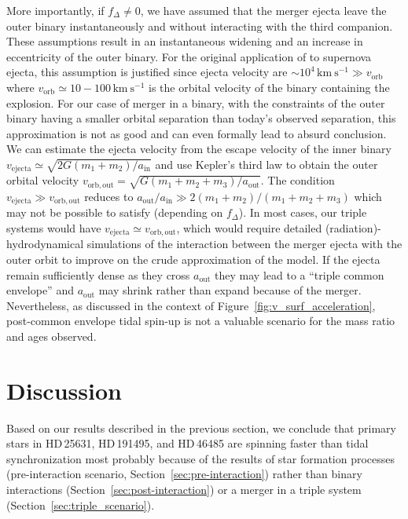 \documentclass{aa}
\DeclareRobustCommand{\Figref}[1]{Figure~\ref{#1}}
\DeclareRobustCommand{\Secref}[1]{Section~\ref{#1}}
\begin{document}
More importantly, if $f_\Delta\neq0$, we have assumed that the merger
ejecta leave the outer binary instantaneously and without
interacting with the third companion. These assumptions result in an
instantaneous widening and an increase in eccentricity of the outer
binary. For the
original application of \cite{blaauw:61} to supernova ejecta, this
assumption is justified since ejecta velocity are
$\sim10^4\,\mathrm{km\ s^{-1}} \gg v_\mathrm{orb}$ where
$v_\mathrm{orb}\simeq10-100\,\mathrm{km\ s^{-1}}$ is the orbital
velocity of the binary containing the explosion. For our case of
merger in a binary, with the constraints of the outer binary having a
smaller orbital separation than today's observed separation,
this approximation is not as good and can even formally lead to
absurd conclusion. We can estimate the ejecta velocity from the escape velocity
of the inner binary
$v_\mathrm{ejecta}\simeq \sqrt{2 G (m_1+m_2)/a_\mathrm{in}}$ and use
Kepler's third law to obtain the outer orbital velocity
$v_\mathrm{orb, out}=\sqrt{G(m_1+m_2+m_3)/a_\mathrm{out}}$. The
condition $v_\mathrm{ejecta}\gg v_\mathrm{orb, out}$ reduces to
$a_\mathrm{out}/a_\mathrm{in} \gg 2(m_1+m_2)/(m_1+m_2+m_3)$ which may
not be possible to satisfy (depending on $f_\Delta$). In most cases,
our triple systems would have
$v_\mathrm{ejecta}\simeq v_\mathrm{orb, out}$, which would require
detailed (radiation)-hydrodynamical simulations of the interaction between
the merger ejecta with the outer orbit to improve on the crude
approximation of the \cite{blaauw:61} model. If the ejecta remain
sufficiently dense as they cross $a_\mathrm{out}$ they may lead to a
``triple common envelope'' \citep[e.g.,][]{toonen:20} and
$a_\mathrm{out}$ may shrink rather than expand because of the merger.
Nevertheless, as discussed in the context of \Figref{fig:v_surf_acceleration}, post-common envelope tidal spin-up is not a valuable scenario for the mass ratio and ages observed.



\section{Discussion}
\label{sec:discussions}

Based on our results described in the previous section, we conclude
  that primary stars in HD\,25631, HD\,191495, and HD\,46485 are spinning faster than tidal synchronization most
probably because of the results of star formation processes (pre-interaction scenario, \Secref{sec:pre-interaction}) rather than binary
interactions (\Secref{sec:post-interaction}) or a merger in a triple system (\Secref{sec:triple_scenario}).
\end{document}
